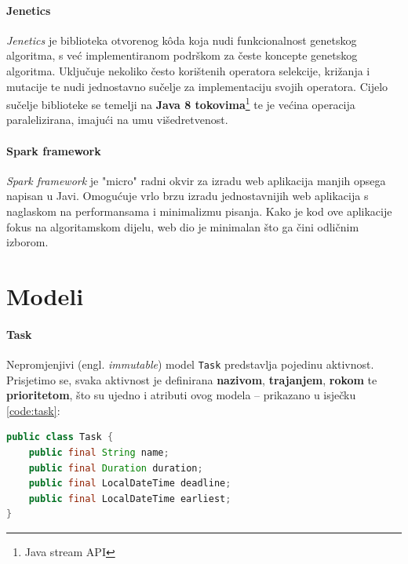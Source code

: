 \documentclass[times, utf8, zavrsni]{fer}
\begin{document}
\paragraph{Jenetics} \textit{Jenetics} je biblioteka otvorenog k{\^o}da koja nudi funkcionalnost genetskog algoritma, s već implementiranom podrškom za česte koncepte genetskog algoritma. Uključuje nekoliko često korištenih operatora selekcije, križanja i mutacije te nudi jednostavno sučelje za implementaciju svojih operatora. Cijelo sučelje biblioteke se temelji na \textbf{Java 8 tokovima}\footnote{Java stream API} te je većina operacija paralelizirana, imajući na umu višedretvenost.

\paragraph{Spark framework} \textit{Spark framework} je "micro" radni okvir za izradu web aplikacija manjih opsega napisan u Javi. Omogućuje vrlo brzu izradu jednostavnijih web aplikacija s naglaskom na performansama i minimalizmu pisanja. Kako je kod ove aplikacije fokus na algoritamskom dijelu, web dio je minimalan što ga čini odličnim izborom.

\section{Modeli}
\paragraph{Task} Nepromjenjivi (engl. \textit{immutable}) model \texttt{Task} predstavlja pojedinu aktivnost. Prisjetimo se, svaka aktivnost je definirana \textbf{nazivom}, \textbf{trajanjem}, \textbf{rokom} te \textbf{prioritetom}, što su ujedno i atributi ovog modela -- prikazano u isječku \ref{code:task}:
\begin{lstlisting}[language=java, caption=Razred Task, label={code:task}]
public class Task {
	public final String name;
	public final Duration duration;
	public final LocalDateTime deadline;
	public final LocalDateTime earliest;
}
\end{lstlisting}
\end{document}
